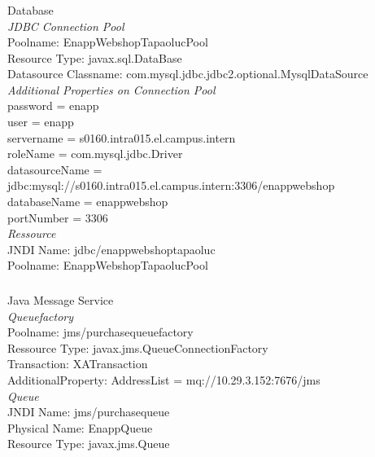 \documentclass[11pt]{amsart}
\begin{document}
\subsubsection{}Database \\
\textit{JDBC Connection Pool}\\
Poolname: EnappWebshopTapaolucPool \\
Resource Type: javax.sql.DataBase \\
Datasource Classname: com.mysql.jdbc.jdbc2.optional.MysqlDataSource \\
\textit{Additional Properties on Connection Pool} \\
password = enapp \\
user = enapp \\
servername = s0160.intra015.el.campus.intern \\
roleName = com.mysql.jdbc.Driver \\
datasourceName = jdbc:mysql://s0160.intra015.el.campus.intern:3306/enappwebshop \\
databaseName = enappwebshop \\
portNumber = 3306 \\
%
\textit{Ressource} \\
JNDI Name: jdbc/enappwebshoptapaoluc \\
Poolname: EnappWebshopTapaolucPool \\
%
\subsubsection{}Java Message Service \\
\textit{Queuefactory} \\
Poolname: jms/purchasequeuefactory \\
Ressource Type: javax.jms.QueueConnectionFactory \\
Transaction: XATransaction \\
AdditionalProperty: AddressList = mq://10.29.3.152:7676/jms \\
\textit{Queue} \\
JNDI Name: jms/purchasequeue \\
Physical Name: EnappQueue \\
Resource Type: javax.jms.Queue \\
%
\end{document}
